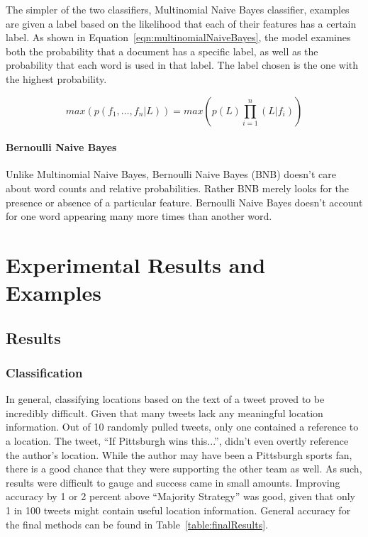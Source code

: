 \documentclass[midd]{thesis}
\begin{document}
The simpler of the two classifiers, Multinomial Naive Bayes classifier, examples are given a label based on the likelihood that each of their features has a certain label. As shown in Equation~\ref{eqn:multinomialNaiveBayes}, the model examines both the probability that a document has a specific label, as well as the probability that each word is used in that label. The label chosen is the one with the highest probability.

\begin{equation}
\label{eqn:multinomialNaiveBayes}
max(p(f_1, \dots, f_n \vert L) )= max(p(L) \prod_{i=1}^n (L|f_i))
\end{equation}

\subsubsection{Bernoulli Naive Bayes}

Unlike Multinomial Naive Bayes, Bernoulli Naive Bayes (BNB) doesn't care about word counts and relative probabilities. Rather BNB merely looks for the presence or absence of a particular feature. Bernoulli Naive Bayes doesn't account for one word appearing many more times than another word.


\chapter{Experimental Results and Examples}


\section{Results}
\subsection{Classification}


In general, classifying locations based on the text of a tweet proved to be incredibly difficult. Given that many tweets lack any meaningful location information. Out of 10 randomly pulled tweets, only one contained a reference to a location. The tweet, ``If Pittsburgh wins this...'', didn't even overtly reference the author's location. While the author may have been a Pittsburgh sports fan, there is a good chance that they were supporting the other team as well. As such, results were difficult to gauge and success came in small amounts. Improving accuracy by 1 or 2 percent above ``Majority Strategy'' was good, given that only 1 in 100 tweets might contain useful location information. General accuracy for the final methods can be found in Table~\ref{table:finalResults}.
\end{document}
